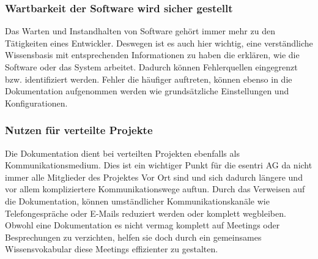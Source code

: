 \documentclass[a4paper,12pt]{scrartcl}
\begin{document}
\subsubsection{Wartbarkeit der Software wird sicher gestellt}
Das Warten und Instandhalten von Software gehört immer mehr zu den Tätigkeiten eines Entwickler. Deswegen ist es auch hier wichtig, eine verständliche Wissensbasis mit entsprechenden Informationen zu haben die erklären, wie die Software oder das System arbeitet. Dadurch können Fehlerquellen eingegrenzt bzw. identifiziert werden. Fehler die häufiger auftreten, können ebenso in die Dokumentation aufgenommen werden wie grundsätzliche Einstellungen und Konfigurationen.
 
\subsubsection{Nutzen für verteilte Projekte}
Die Dokumentation dient bei verteilten Projekten ebenfalls als Kommunikationsmedium. Dies ist ein wichtiger Punkt für die esentri AG da nicht immer alle Mitglieder des Projektes Vor Ort sind und sich dadurch längere und vor allem kompliziertere Kommunikationswege auftun. Durch das Verweisen auf die Dokumentation, können umständlicher Kommunikationskanäle wie Telefongespräche oder E-Mails reduziert werden oder komplett wegbleiben. Obwohl eine Dokumentation es nicht vermag komplett auf Meetings oder Besprechungen zu verzichten, helfen sie doch durch ein gemeinsames Wissensvokabular diese Meetings effizienter zu gestalten. 
\end{document}
